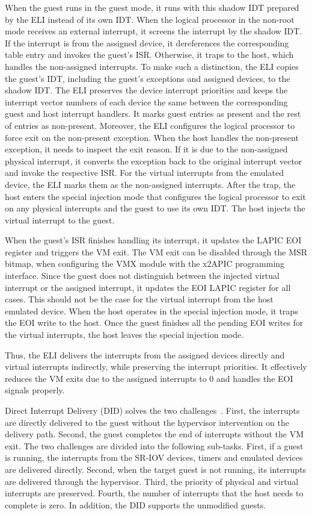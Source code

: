 When the guest runs in the guest mode, it runs with this
shadow IDT prepared by the ELI instead of its own IDT. When
the logical processor in the non-root mode receives an
external interrupt, it screens the interrupt by the shadow
IDT. If the interrupt is from the assigned device, it
dereferences the corresponding table entry and invokes the
guest's ISR. Otherwise, it traps to the host, which handles
the non-assigned interrupts. To make such a distinction, the
ELI copies the guest's IDT, including the guest's exceptions
and assigned devices, to the shadow IDT. The ELI preserves
the device interrupt priorities and keeps the interrupt vector
numbers of each device the same between the corresponding
guest and host interrupt handlers. It marks guest entries as
present and the rest of entries as non-present. Moreover, the
ELI configures the logical processor to force exit on the
non-present exception. When the host handles the non-present
exception, it needs to inspect the exit reason. If it is due
to the non-assigned physical interrupt, it converts the
exception back to the original interrupt vector and invoke the
respective ISR. For the virtual interrupts from the emulated
device, the ELI marks them as the non-assigned interrupts.
After the trap, the host enters the special injection mode
that configures the logical processor to exit on any physical
interrupts and the guest to use its own IDT. The host injects
the virtual interrupt to the guest.

When the guest's ISR finishes handling its interrupt, it
updates the LAPIC EOI register and triggers the VM exit. The
VM exit can be disabled through the MSR bitmap, when
configuring the VMX module with the x2APIC programming
interface. Since the guest does not distinguish between the
injected virtual interrupt or the assigned interrupt, it
updates the EOI LAPIC register for all cases. This should not
be the case for the virtual interrupt from the host emulated
device. When the host operates in the special injection mode,
it traps the EOI write to the host. Once the guest finishes
all the pending EOI writes for the virtual interrupts, the
host leaves the special injection mode.

Thus, the ELI delivers the interrupts from the assigned
devices directly and virtual interrupts indirectly, while
preserving the interrupt priorities. It effectively reduces
the VM exits due to the assigned interrupts to 0 and handles
the EOI signals properly.

Direct Interrupt Delivery (DID) solves the two
challenges~\cite{tu:2015}. First, the interrupts are directly
delivered to the guest without the hypervisor intervention on
the delivery path. Second, the guest completes the end of
interrupts without the VM exit. The two challenges are divided
into the following sub-tasks. First, if a guest is running,
the interrupts from the SR-IOV devices, timers and emulated
devices are delivered directly. Second, when the target guest
is not running, its interrupts are delivered through the
hypervisor. Third, the priority of physical and virtual
interrupts are preserved. Fourth, the number of interrupts
that the host needs to complete is zero. In addition, the DID
supports the unmodified guests.

